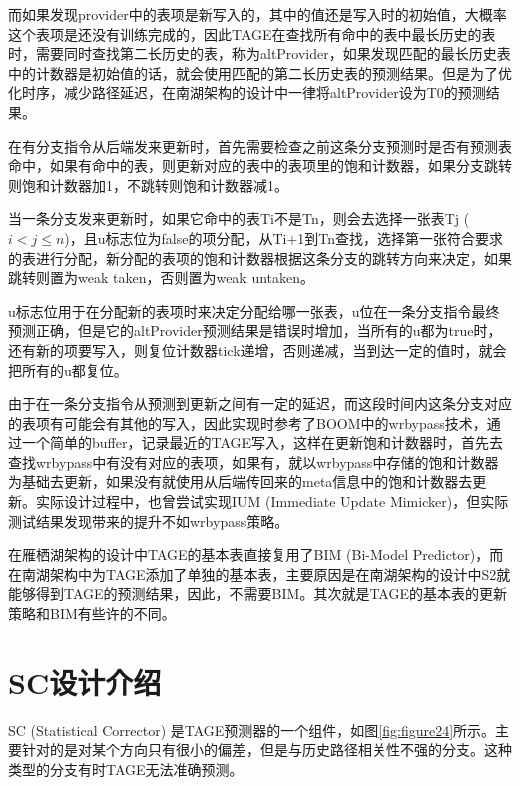 而如果发现provider中的表项是新写入的，其中的值还是写入时的初始值，大概率这个表项是还没有训练完成的，因此TAGE在查找所有命中的表中最长历史的表时，需要同时查找第二长历史的表，称为altProvider，如果发现匹配的最长历史表中的计数器是初始值的话，就会使用匹配的第二长历史表的预测结果。但是为了优化时序，减少路径延迟，在南湖架构的设计中一律将altProvider设为T0的预测结果。


在有分支指令从后端发来更新时，首先需要检查之前这条分支预测时是否有预测表命中，如果有命中的表，则更新对应的表中的表项里的饱和计数器，如果分支跳转则饱和计数器加1，不跳转则饱和计数器减1。

当一条分支发来更新时，如果它命中的表Ti不是Tn，则会去选择一张表Tj ($i < j \le n$)，且u标志位为false的项分配，从Ti+1到Tn查找，选择第一张符合要求的表进行分配，新分配的表项的饱和计数器根据这条分支的跳转方向来决定，如果跳转则置为weak taken，否则置为weak untaken。

u标志位用于在分配新的表项时来决定分配给哪一张表，u位在一条分支指令最终预测正确，但是它的altProvider预测结果是错误时增加，当所有的u都为true时，还有新的项要写入，则复位计数器tick递增，否则递减，当到达一定的值时，就会把所有的u都复位。

由于在一条分支指令从预测到更新之间有一定的延迟，而这段时间内这条分支对应的表项有可能会有其他的写入，因此实现时参考了BOOM中的wrbypass技术，通过一个简单的buffer，记录最近的TAGE写入，这样在更新饱和计数器时，首先去查找wrbypass中有没有对应的表项，如果有，就以wrbypass中存储的饱和计数器为基础去更新，如果没有就使用从后端传回来的meta信息中的饱和计数器去更新。实际设计过程中，也曾尝试实现IUM (Immediate Update Mimicker)\cite{isl-tage}，但实际测试结果发现带来的提升不如wrbypass策略。

在雁栖湖架构的设计中TAGE的基本表直接复用了BIM (Bi-Model Predictor)\cite{bi-mode}，而在南湖架构中为TAGE添加了单独的基本表，主要原因是在南湖架构的设计中S2就能够得到TAGE的预测结果，因此，不需要BIM。其次就是TAGE的基本表的更新策略和BIM有些许的不同。


\section{SC设计介绍}

SC (Statistical Corrector) 是TAGE预测器的一个组件，如图\ref{fig:figure24}所示。主要针对的是对某个方向只有很小的偏差，但是与历史路径相关性不强的分支\cite{tage-sc-l, isl-tage}。这种类型的分支有时TAGE无法准确预测。

